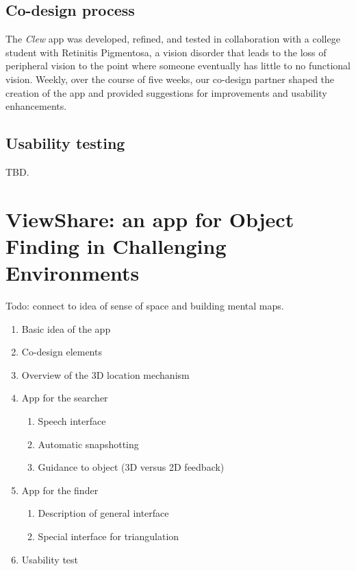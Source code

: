 \documentclass[chi_draft]{sigchi}
\begin{document}
\subsection{Co-design process}
The \emph{Clew} app was developed, refined, and tested in collaboration with a college student with Retinitis Pigmentosa, a vision disorder that leads to the loss of peripheral vision to the point where someone eventually has little to no functional vision.  Weekly, over the course of five weeks, our co-design partner shaped the creation of the app and provided suggestions for improvements and usability enhancements.

\subsection{Usability testing}
TBD.

\section{ViewShare: an app for Object Finding in Challenging Environments}
Todo: connect to idea of sense of space and building mental maps.
\begin{enumerate}
\item Basic idea  of the app
\item Co-design elements
\item Overview of the 3D location mechanism
\item App for the searcher
\begin{enumerate}
\item Speech interface
\item Automatic snapshotting
\item Guidance to object (3D versus 2D feedback)
\end{enumerate}
\item App for the finder
\begin{enumerate}
\item Description of general interface
\item Special interface for triangulation
\end{enumerate}
\item Usability test
\end{enumerate}
\end{document}
